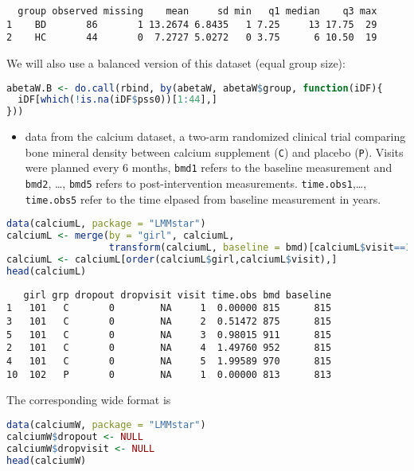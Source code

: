 \documentclass[12pt]{article}
\begin{document}
\label{}
\begin{verbatim}
  group observed missing    mean     sd min   q1 median    q3 max
1    BD       86       1 13.2674 6.8435   1 7.25     13 17.75  29
2    HC       44       0  7.2727 5.0272   0 3.75      6 10.50  19
\end{verbatim}


We will also use a balanced version of this dataset (equal group size):
\begin{lstlisting}[language=r,numbers=none]
abetaW.B <- do.call(rbind, by(abetaW, abetaW$group, function(iDF){
  iDF[which(!is.na(iDF$pss0))[1:44],]
}))
\end{lstlisting}

\clearpage

\begin{itemize}
\item data from the calcium dataset, a two-arm randomized clinical trial
comparing bone mineral density between calcium supplement (\texttt{C}) and
placebo (\texttt{P}). Visits were planned every 6 months, \texttt{bmd1} refers to
the baseline measurement and \texttt{bmd2}, \ldots, \texttt{bmd5} refers to
post-intervention measurements. \texttt{time.obs1},\ldots, \texttt{time.obs5}
refer to the time elpased from baseline measurement in years.
\end{itemize}

\begin{lstlisting}[language=r,numbers=none]
data(calciumL, package = "LMMstar")
calciumL <- merge(by = "girl", calciumL,
                  transform(calciumL, baseline = bmd)[calciumL$visit==1,c("girl","baseline")])
calciumL <- calciumL[order(calciumL$girl,calciumL$visit),]
head(calciumL)
\end{lstlisting}

\label{}
\begin{verbatim}
   girl grp dropout dropvisit visit time.obs bmd baseline
1   101   C       0        NA     1  0.00000 815      815
3   101   C       0        NA     2  0.51472 875      815
5   101   C       0        NA     3  0.98015 911      815
2   101   C       0        NA     4  1.49760 952      815
4   101   C       0        NA     5  1.99589 970      815
10  102   P       0        NA     1  0.00000 813      813
\end{verbatim}



The corresponding wide format is
\begin{lstlisting}[language=r,numbers=none]
data(calciumW, package = "LMMstar")
calciumW$dropout <- NULL
calciumW$dropvisit <- NULL
head(calciumW)
\end{lstlisting}
\end{document}
